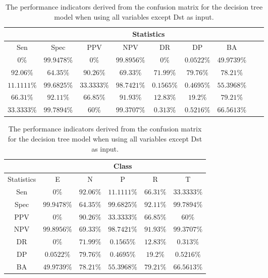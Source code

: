\begin{table}[!ht]
	\centering
	\begin{tabular}{|c|c|c|c|c|c|c|c|c|}
		\hline
		 & \multicolumn{7}{c|}{Statistics} \\ \hline
		Sen & Spec & PPV & NPV & DR & DP & BA \\ \hline
		$0\%$ & $99.9478\%$ & $0\%$ & $99.8956\%$ & $0\%$ & $0.0522\%$ & $49.9739\%$ \\ \hline
		$92.06\%$ & $64.35\%$ & $90.26\%$ & $69.33\%$ & $71.99\%$ & $79.76\%$ & $78.21\%$ \\ \hline
		$11.1111\%$ & $99.6825\%$ & $33.3333\%$ & $98.7421\%$ & $0.1565\%$ & $0.4695\%$ & $55.3968\%$ \\ \hline
		$66.31\%$ & $92.11\%$ & $66.85\%$ & $91.93\%$ & $12.83\%$ & $19.2\%$ & $79.21\%$ \\ \hline
		$33.3333\%$ & $99.7894\%$ & $60\%$ & $99.3707\%$ & $0.313\%$ & $0.5216\%$ & $66.5613\%$ \\ \hline
	\end{tabular}
	\caption{The performance indicators derived from the confusion matrix for the decision tree model when using all variables except Dst as input.}
	\label{tab:cs:noDst:C5.0}
\end{table}

\begin{table}[!ht]
	\centering
	\begin{tabular}{|c|c|c|c|c|c|}
		\hline
		 & \multicolumn{5}{c|}{Class} \\ \hline
		Statistics & E & N & P & R & T \\ \hline
		Sen & $0\%$ & $92.06\%$ & $11.1111\%$ & $66.31\%$ & $33.3333\%$ \\ \hline
		Spec & $99.9478\%$ & $64.35\%$ & $99.6825\%$ & $92.11\%$ & $99.7894\%$ \\ \hline
		PPV & $0\%$ & $90.26\%$ & $33.3333\%$ & $66.85\%$ & $60\%$ \\ \hline
		NPV & $99.8956\%$ & $69.33\%$ & $98.7421\%$ & $91.93\%$ & $99.3707\%$ \\ \hline
		DR & $0\%$ & $71.99\%$ & $0.1565\%$ & $12.83\%$ & $0.313\%$ \\ \hline
		DP & $0.0522\%$ & $79.76\%$ & $0.4695\%$ & $19.2\%$ & $0.5216\%$ \\ \hline
		BA & $49.9739\%$ & $78.21\%$ & $55.3968\%$ & $79.21\%$ & $66.5613\%$ \\ \hline
	\end{tabular}
	\caption{The performance indicators derived from the confusion matrix for the decision tree model when using all variables except Dst as input.}
	\label{tab:cs:reverse:noDst:C5.0}
\end{table}

